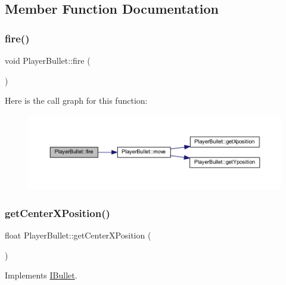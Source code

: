 \subsection{Member Function Documentation}
\mbox{\label{class_player_bullet_a4ef09e533d8d3016d7e08d9efae238ff}} 
\subsubsection{\texorpdfstring{fire()}{fire()}}
{\footnotesize\ttfamily void Player\+Bullet\+::fire (\begin{DoxyParamCaption}{ }\end{DoxyParamCaption})}

Here is the call graph for this function\+:\nopagebreak
\begin{figure}[H]
\begin{center}
\leavevmode
\includegraphics[width=350pt]{class_player_bullet_a4ef09e533d8d3016d7e08d9efae238ff_cgraph}
\end{center}
\end{figure}
\mbox{\label{class_player_bullet_a73c27dca47ea3fdcecd82ce4b2089c4a}} 
\subsubsection{\texorpdfstring{get\+Center\+X\+Position()}{getCenterXPosition()}}
{\footnotesize\ttfamily float Player\+Bullet\+::get\+Center\+X\+Position (\begin{DoxyParamCaption}{ }\end{DoxyParamCaption})\hspace{0.3cm}{\ttfamily [virtual]}}



Implements \hyperlink{class_i_bullet_a43a43e2df81e05a03be42d9025e6dd2a}{I\+Bullet}.

